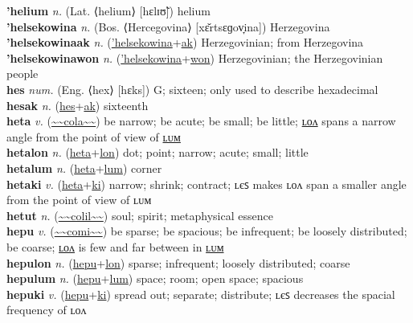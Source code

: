 \textbf{'helium} \textit{n.} (Lat. ⟨helium⟩ [hɛlɪʊ̃])
helium \label{'helium} \\
\textbf{'helsekowina} \textit{n.} (Bos. ⟨Hercegovina⟩ [xɛ̌rtsɛɡov̞ina])
Herzegovina \label{'helsekowina} \\
\textbf{'helsekowinaak} \textit{n.} (\hyperref['helsekowina]{'helsekowina}+\hyperref[ak]{ak})
Herzegovinian; from Herzegovina \label{'helsekowinaak} \\
\textbf{'helsekowinawon} \textit{n.} (\hyperref['helsekowina]{'helsekowina}+\hyperref[won]{won})
Herzegovinian; the Herzegovinian people \label{'helsekowinawon} \\
\textbf{hes} \textit{num.} (Eng. ⟨hex⟩ [hɛks])
G; sixteen; only used to describe hexadecimal \label{hes} \\
\textbf{hesak} \textit{n.} (\hyperref[hes]{hes}+\hyperref[ak]{ak})
sixteenth \label{hesak} \\
\textbf{heta} \textit{v.} (\hyperref[cola]{\~{}\~{}cola\~{}\~{}})
be narrow; be acute; be small; be little; \hyperref[hetalon]{ʟᴏᴧ} spans a narrow angle from the point of view of \hyperref[hetalum]{ʟᴜᴍ} \label{heta} \\
\textbf{hetalon} \textit{n.} (\hyperref[heta]{heta}+\hyperref[lon]{lon})
dot; point; narrow; acute; small; little \label{hetalon} \\
\textbf{hetalum} \textit{n.} (\hyperref[heta]{heta}+\hyperref[lum]{lum})
corner \label{hetalum} \\
\textbf{hetaki} \textit{v.} (\hyperref[heta]{heta}+\hyperref[ki]{ki})
narrow; shrink; contract; ʟєꜱ makes ʟᴏᴧ span a smaller angle from the point of view of ʟᴜᴍ \label{hetaki} \\
\textbf{hetut} \textit{n.} (\hyperref[colil]{\~{}\~{}colil\~{}\~{}})
soul; spirit; metaphysical essence \label{hetut} \\
\textbf{hepu} \textit{v.} (\hyperref[comi]{\~{}\~{}comi\~{}\~{}})
be sparse; be spacious; be infrequent; be loosely distributed; be coarse; \hyperref[hepulon]{ʟᴏᴧ} is few and far between in \hyperref[hepulum]{ʟᴜᴍ} \label{hepu} \\
\textbf{hepulon} \textit{n.} (\hyperref[hepu]{hepu}+\hyperref[lon]{lon})
sparse; infrequent; loosely distributed; coarse \label{hepulon} \\
\textbf{hepulum} \textit{n.} (\hyperref[hepu]{hepu}+\hyperref[lum]{lum})
space; room; open space; spacious \label{hepulum} \\
\textbf{hepuki} \textit{v.} (\hyperref[hepu]{hepu}+\hyperref[ki]{ki})
spread out; separate; distribute; ʟєꜱ decreases the spacial frequency of ʟᴏᴧ \label{hepuki} \\
